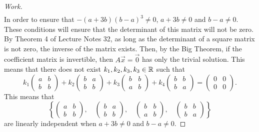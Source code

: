 \documentclass{article}
\begin{document}
\begin{proof}[Work]
\begin{align*}
  \end{align*}
  In order to ensure that $-(a+3b)(b-a)^3 \neq 0$, $a+3b \neq 0$ and $b-a \neq 0$. These conditions will ensure that the determinant of this matrix will not be zero. By Theorem 4 of Lecture Notes 32, as long as the determinant of a square matrix is not zero, the inverse of the matrix exists. Then, by the Big Theorem, if the coefficient matrix is invertible, then $A\vec{x} = \vec{0}$ has only the trivial solution. This means that there does not exist $k_1, k_2, k_3, k_3 \in \mathbb{R}$ such that
  \[
    k_1\begin{pmatrix}
      a & b \\
      b & b
    \end{pmatrix} + k_2 \begin{pmatrix}
      b & a \\
      b & b
    \end{pmatrix} + k_3 \begin{pmatrix}
      b & b \\
      a & b
    \end{pmatrix} + k_4\begin{pmatrix}
      b & b \\
      b & a
    \end{pmatrix} = \begin{pmatrix}
      0 & 0 \\
      0 & 0
    \end{pmatrix}.
  \]
  This means that
  \[
    \left\{ \begin{pmatrix}
      a & b \\
      b & b
    \end{pmatrix}, \quad \begin{pmatrix}
      b & a \\
      b & b
    \end{pmatrix}, \quad \begin{pmatrix}
      b & b \\
      a & b
    \end{pmatrix}, \quad \begin{pmatrix}
      b & b \\
      b & a
    \end{pmatrix}\right\}
  \]
  are linearly independent when $a+3b \neq 0$ and $b-a \neq 0$.
\end{proof}
\qdash
\end{document}

